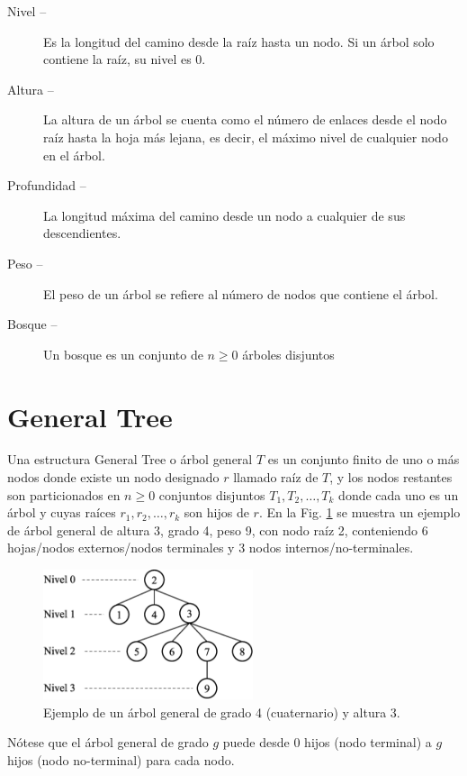 \begin{description}
\item[Nivel –] Es la longitud del camino desde la raíz hasta un nodo. Si un árbol solo contiene la raíz, su nivel es 0.
\item[Altura –] La altura de un árbol se cuenta como el número de enlaces desde el nodo raíz hasta la hoja más lejana, es decir, el máximo nivel de cualquier nodo en el árbol.
\item[Profundidad –] La longitud máxima del camino desde un nodo a cualquier de sus descendientes.
\item[Peso –] El peso de un árbol se refiere al número de nodos que contiene el árbol.
\item[Bosque –] Un bosque es un conjunto de $n \ge 0$ árboles disjuntos
\end{description}

\section{General Tree}

Una estructura General Tree o árbol general $T$ es un conjunto finito de uno o más nodos donde existe un nodo designado $r$ llamado raíz de $T$, y los nodos restantes son particionados en $n \ge 0$ conjuntos disjuntos $T_1, T_2, \dots, T_k$ donde cada uno es un árbol y cuyas raíces $r_1, r_2, \dots, r_k$ son hijos de $r$. En la Fig. \ref{fig:gentree} se muestra un ejemplo de árbol general de altura 3, grado 4, peso 9, con nodo raíz 2, conteniendo 6 hojas/nodos externos/nodos terminales y 3 nodos internos/no-terminales.

\begin{figure}[htpb!]
  \begin{center}
    \includegraphics[width=0.55\textwidth]{images/gentree.eps}
  \end{center}
  \caption{Ejemplo de un árbol general de grado 4 (cuaternario) y altura 3.}
  \label{fig:gentree}
\end{figure}

Nótese que el árbol general de grado $g$ puede desde $0$ hijos (nodo terminal) a $g$ hijos (nodo no-terminal) para cada nodo.

